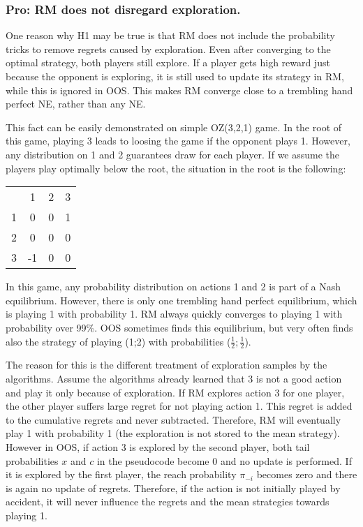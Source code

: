 \documentclass[preprint,12pt]{elsarticle}
\begin{document}
\subsubsection{Pro: RM does not disregard exploration.}

One reason why H1 may be true is that RM does not include the probability tricks to remove regrets caused by exploration. Even after converging to the optimal strategy, both players still explore. If a player gets high reward just because the opponent is exploring, it is still used to update its strategy in RM, while this is ignored in OOS. This makes RM converge close to a trembling hand perfect NE, rather than any NE.

This fact can be easily demonstrated on simple OZ(3,2,1) game. In the root of this game, playing 3 leads to loosing the game if the opponent plays 1. However, any distribution on 1 and 2 guarantees draw for each player. If we assume the players play optimally below the root, the situation in the root is the following:

\begin{center}
\begin{tabular}{c|c|c|c|}
\multicolumn{1}{c}{} & \multicolumn{1}{c}{1} & \multicolumn{1}{c}{2} & \multicolumn{1}{c}{3}\\\cline{2-4}
1& 0 & 0 & 1\\\cline{2-4}
2& 0 & 0 & 0\\\cline{2-4}
3&-1 & 0 & 0\\\cline{2-4}
\end{tabular}
\end{center}

In this game, any probability distribution on actions 1 and 2 is part of a Nash equilibrium. However, there is only one trembling hand perfect equilibrium, which is playing 1 with probability 1. RM always quickly converges to playing 1 with probability over 99\%. OOS sometimes finds this equilibrium, but very often finds also the strategy of playing (1;2) with probabilities ($\frac{1}{2};\frac{1}{2}$).

The reason for this is the different treatment of exploration samples by the algorithms. Assume the algorithms already learned that 3 is not a good action and play it only because of exploration. If RM explores action 3 for one player, the other player suffers large regret for not playing action 1. This regret is added to the cumulative regrets and never subtracted. Therefore, RM will eventually play 1 with probability 1 (the exploration is not stored to the mean strategy). However in OOS, if action 3 is explored by the second player, both tail probabilities $x$ and $c$ in the pseudocode become 0 and no update is performed. If it is explored by the first player, the reach probability $\pi_{-i}$ becomes zero and there is again no update of regrets. Therefore, if the action is not initially played by accident, it will never influence the regrets and the mean strategies towards playing 1.
\end{document}

